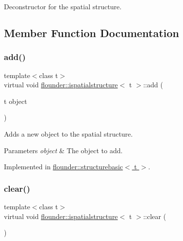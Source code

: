 Deconstructor for the spatial structure. 



\subsection{Member Function Documentation}
\mbox{\label{classflounder_1_1ispatialstructure_abd7886a29a4c6ec867ec0f611f5a667b}} 
\subsubsection{\texorpdfstring{add()}{add()}}
{\footnotesize\ttfamily template$<$class t$>$ \\
virtual void \hyperlink{classflounder_1_1ispatialstructure}{flounder\+::ispatialstructure}$<$ t $>$\+::add (\begin{DoxyParamCaption}\item[{t}]{object }\end{DoxyParamCaption})\hspace{0.3cm}{\ttfamily [pure virtual]}}



Adds a new object to the spatial structure. 


\begin{DoxyParams}{Parameters}
{\em object} & The object to add. \\
\hline
\end{DoxyParams}


Implemented in \hyperlink{classflounder_1_1structurebasic_a75d3685a3341fcaef9e28deaf1f2dcd2}{flounder\+::structurebasic$<$ t $>$}.

\mbox{\label{classflounder_1_1ispatialstructure_a422fac0231ea3095e2f85951259a4686}} 
\subsubsection{\texorpdfstring{clear()}{clear()}}
{\footnotesize\ttfamily template$<$class t$>$ \\
virtual void \hyperlink{classflounder_1_1ispatialstructure}{flounder\+::ispatialstructure}$<$ t $>$\+::clear (\begin{DoxyParamCaption}{ }\end{DoxyParamCaption})\hspace{0.3cm}{\ttfamily [pure virtual]}}



